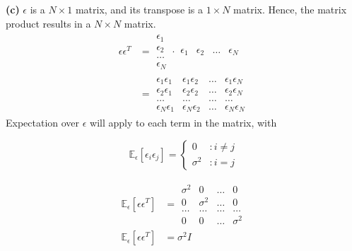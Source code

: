 \documentclass[12pt]{article}
\newcommand{\e}[0]{\epsilon}
\begin{document}
\textbf{(c)}
\(\e\) is a \(N\times1\) matrix, and its transpose is a \(1\times N\) matrix. Hence, the matrix product results in a \(N\times N\) matrix.
\begin{align*}
    \e\e^T & = \begin{array}{|c|}
         \e_1  \\
         \e_2 \\
         \ldots \\
         \e_N
    \end{array} \cdot
    \begin{array}{|cccc|}
         \e_1 & \e_2 & \ldots & \e_N
    \end{array} \\ \nonumber
    & = \begin{array}{|cccc|}
         \e_1\e_1 & \e_1\e_2 & \ldots & \e_1\e_N \\
         \e_2\e_1 & \e_2\e_2 & \ldots & \e_2\e_N \\
         \ldots & \ldots & \ldots & \ldots \\
         \e_N\e_1 & \e_N\e_2 & \ldots & \e_N\e_N
    \end{array}
\end{align*}
Expectation over \(\e\) will apply to each term in the matrix, with

\[\mathbb{E}_{\e}[\e_i\e_j] = \left\{
  \begin{array}{lr}
    0 & : i \neq j\\
    \sigma^2 & : i = j
  \end{array}
\right.
\]

\begin{align} \nonumber
    \mathbb{E}_{\e}[\e\e^T] & = \begin{array}{|cccc|}
         \sigma^2 & 0 & \ldots & 0 \\
         0 & \sigma^2 & \ldots & 0 \\
         \ldots & \ldots & \ldots & \ldots \\
         0 & 0 & \ldots & \sigma^2
    \end{array} \\ 
    \mathbb{E}_{\e}[\e\e^T] & = \sigma^2I \\ \nonumber
\end{align}
\end{document}
